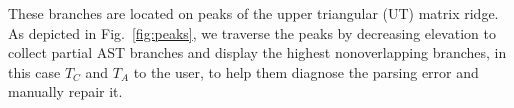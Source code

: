 \documentclass[sigplan,review,anonymous,acmsmall]{acmart}\settopmatter{printfolios=false,printccs=false,printacmref=false}
\begin{document}
These branches are located on peaks of the upper triangular (UT) matrix ridge. As depicted in Fig.~\ref{fig:peaks}, we traverse the peaks by decreasing elevation to collect partial AST branches and display the highest nonoverlapping branches, in this case $T_C$ and $T_A$ to the user, to help them diagnose the parsing error and manually repair it.


%
%
%
\end{document}
